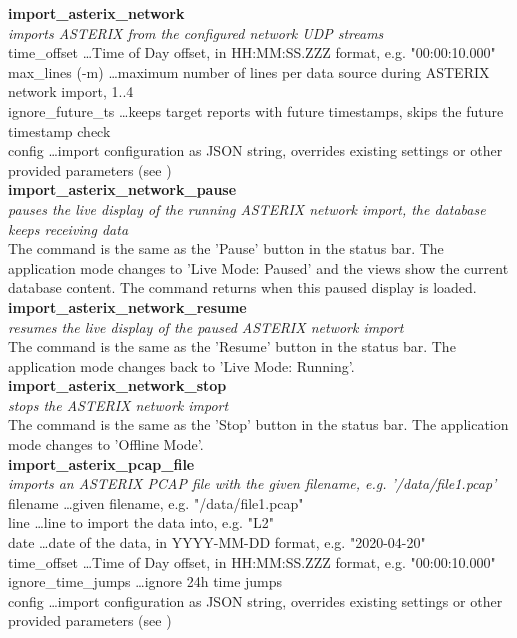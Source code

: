 \textbf{import\_asterix\_network} \\
\textit{imports ASTERIX from the configured network UDP streams} \\
time\_offset \dots Time of Day offset, in HH:MM:SS.ZZZ format, e.g. "00:00:10.000" \\
max\_lines (-m) \dots maximum number of lines per data source during ASTERIX network import, 1..4 \\
ignore\_future\_ts \dots keeps target reports with future timestamps, skips the future timestamp check \\
config \dots import configuration as JSON string, overrides existing settings or other provided parameters (see ) \\

\textbf{import\_asterix\_network\_pause} \\
\textit{pauses the live display of the running ASTERIX network import, the database keeps receiving data} \\
The command is the same as the 'Pause' button in the status bar. The application mode changes to 'Live Mode: Paused' and the views show the current database content. The command returns when this paused display is loaded. \\

\textbf{import\_asterix\_network\_resume} \\
\textit{resumes the live display of the paused ASTERIX network import} \\
The command is the same as the 'Resume' button in the status bar. The application mode changes back to 'Live Mode: Running'. \\

\textbf{import\_asterix\_network\_stop} \\
\textit{stops the ASTERIX network import} \\
The command is the same as the 'Stop' button in the status bar. The application mode changes to 'Offline Mode'. \\

\textbf{import\_asterix\_pcap\_file} \\
\textit{imports an ASTERIX PCAP file with the given filename, e.g. '/data/file1.pcap'} \\
filename \dots given filename, e.g. "/data/file1.pcap" \\
line \dots line to import the data into, e.g. "L2" \\
date \dots date of the data, in YYYY-MM-DD format, e.g. "2020-04-20" \\
time\_offset \dots Time of Day offset, in HH:MM:SS.ZZZ format, e.g. "00:00:10.000" \\
ignore\_time\_jumps \dots ignore 24h time jumps \\
config \dots import configuration as JSON string, overrides existing settings or other provided parameters (see ) \\

